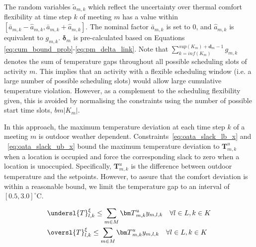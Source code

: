 The random variables $\tilde{a}_{m,k}$ which reflect the uncertainty over thermal comfort flexibility at time step $k$ of meeting $m$ has a value within $\left[\bar{a}_{m,k}\!-\!\hat{a}_{m,k}, \bar{a}_{m,k}\!+\!\hat{a}_{m,k}\right]$. The nominal factor $\bar{a}_{m,k}$ is set to 0, and $\hat{a}_{m,k}$ is equivalent to $g_{m,k}$. ${\bm \delta}_m$ is pre-calculated based on Equations \eqref{eq:cum_bound_prob}-\eqref{eq:pm_delta_link}. Note that $\sum\limits_{k=inf(K_m)}^{sup(K_m)+{\bm d}_m -1}g_{m,k}$ denotes the sum of temperature gaps throughout all possible scheduling slots of activity $m$. This implies that an activity with a flexible scheduling window (i.e. a large number of possible scheduling slots) would allow large cumulative temperature violation. 
However, as a complement to the scheduling flexibility given, this is avoided by normalising the constraints using the number of possible start time slots, $bm{\left|K_m\right|}$.

In this approach, the maximum temperature deviation at each time step $k$ of a meeting $m$ is outdoor weather dependent. 
Constraints~\eqref{eq:oata_slack_lb_x} and ~\eqref{eq:oata_slack_ub_x} bound the maximum temperature deviation to ${\bm T}^u_{m,k}$ when a location is occupied and force the corresponding slack to zero when a location is unoccupied. Specifically, ${\bm T}^u_{m,k}$ is the difference between outdoor temperature and the setpoints. However, to assure that the comfort deviation is within a reasonable bound, we limit the temperature gap to an interval of $\left[0.5, 3.0\right]^{\circ}\mathrm{C}$. 

\begingroup
\begin{align}
&\undersl{T}^{\xi}_{l,k}  \leq \sum\limits_{m \in M}{\bm T}^u_{m,k} y_{m,l,k} \quad  \forall l \in L, k \in K \label{eq:oata_slack_lb_x}  \\
&\oversl{T}^{\xi}_{l,k}   \leq \sum\limits_{m \in M}{\bm T}^u_{m,k} y_{m,l,k} \quad  \forall l \in L, k \in K \label{eq:oata_slack_ub_x}
\end{align}
\endgroup

